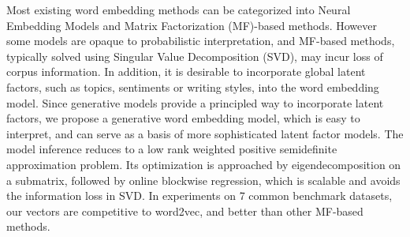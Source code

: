 Most existing word embedding methods can be categorized into Neural Embedding Models and Matrix Factorization (MF)-based methods. However some models are opaque to probabilistic interpretation, and MF-based methods, typically solved using Singular Value Decomposition (SVD), may incur loss of corpus information. In addition, it is desirable to incorporate global latent factors, such as topics, sentiments or writing styles, into the word embedding model. Since generative models provide a principled way to incorporate latent factors, we propose a generative word embedding model, which is easy to interpret, and can serve as a basis of more sophisticated latent factor models. The model inference reduces to a low rank weighted positive semidefinite approximation problem. Its optimization is approached by eigendecomposition on a submatrix, followed by online blockwise regression, which is scalable and avoids the information loss in SVD. In experiments on 7 common benchmark datasets, our vectors are competitive to word2vec, and better than other MF-based methods.

